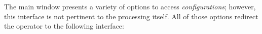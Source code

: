 \documentclass[]{article}
\begin{document}
\begin{minipage}{\linewidth}%
\end{minipage}

The main window presents a variety of options to access \textit{configurations}; however, this interface is not pertinent to the processing itself. All of those options redirect the operator to the following interface:

\begin{minipage}{\linewidth}%
\end{minipage}
\end{document}
